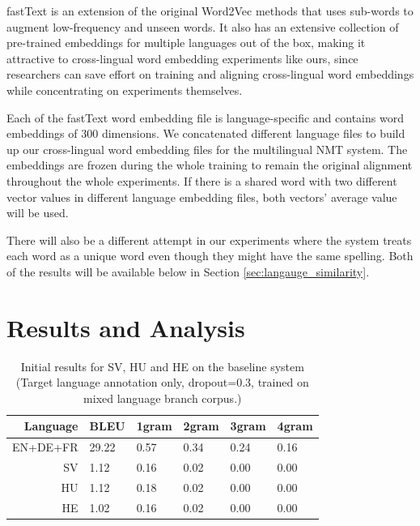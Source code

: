 \documentclass[thesis,fonts=libertine]{cluu}
\begin{document}
fastText is an extension of the original Word2Vec methods that uses sub-words to augment low-frequency and unseen words. It also has an extensive collection of pre-trained embeddings for multiple languages out of the box, making it attractive to cross-lingual word embedding experiments like ours, since researchers can save effort on training and aligning cross-lingual word embeddings while concentrating on experiments themselves.

Each of the fastText word embedding file is language-specific and contains word embeddings of 300 dimensions. We concatenated different language files to build up our cross-lingual word embedding files for the multilingual NMT system. The embeddings are frozen during the whole training to remain the original alignment throughout the whole experiments. If there is a shared word with two different vector values in different language embedding files, both vectors' average value will be used.

There will also be a different attempt in our experiments where the system treats each word as a unique word even though they might have the same spelling. Both of the results will be available below in Section \ref{sec:langauge_similarity}.


\chapter{Results and Analysis}
\label{chap:results}

\begin{table}
  \centering
  \begin{tabular}{r|*{5}{l}}
    \hline
    \textbf{Language} & \textbf{BLEU} & \textbf{1gram} & \textbf{2gram} & \textbf{3gram} & \textbf{4gram} \\ [0.25ex]
    \hline\hline
    EN+DE+FR & 29.22 & 0.57 & 0.34 & 0.24 & 0.16 \\
    SV & 1.12 & 0.16 & 0.02 & 0.00 & 0.00 \\ 
    HU & 1.12 & 0.18 & 0.02 & 0.00 & 0.00 \\
    HE & 1.02 & 0.16 & 0.02 & 0.00 & 0.00 \\
    \hline
  \end{tabular}
  \caption{Initial results for SV, HU and HE on the baseline system (Target language annotation only, dropout=0.3, trained on mixed language branch corpus.)}
  \label{table:initial_results}
\end{table}
\end{document}

